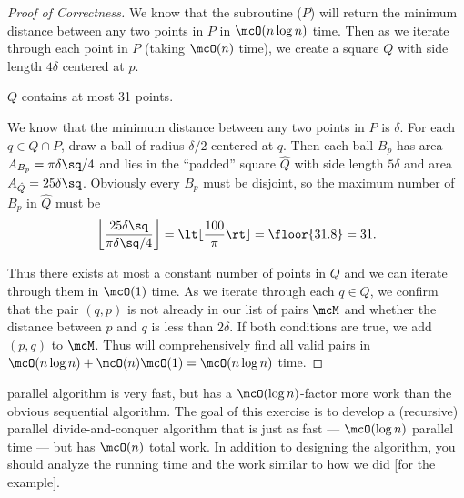 \documentclass[10pt]{article}
\begin{document}
\begin{proof}[Proof of Correctness]
We know that the subroutine ($ P $) will return the minimum distance between any two points in $ P $ in $ \mcO(n\log n) $ time. Then as we iterate through each point in $ P $ (taking $ \mcO(n) $ time), we create a square $ Q $ with side length $ 4\delta $ centered at $ p $.
  \begin{claim}
    $ Q $ contains at most 31 points.
  \end{claim}
  \begin{subproof}
  We know that the minimum distance between any two points in $ P $ is $ \delta $. For each $ q\in Q\cap P $, draw a ball of radius $ \delta/2 $ centered at $ q $. Then each ball $ B_p $ has area $ A_{B_p} = \pi \delta\sq /4 $ and lies in the ``padded'' square $ \hat Q $ with side length $ 5\delta $ and area $ A_{\hat Q} = 25\delta\sq $. Obviously every $ B_p $ must be disjoint, so the maximum number of $ B_p $ in $ \hat Q $ must be \begin{align*}
    \left\lfloor\frac{25\delta\sq}{\pi\delta\sq/4}\right\rfloor = \lt\lfloor\frac{100}{\pi}\rt\rfloor = \floor{31.8} = 31.
  \end{align*}
\end{subproof}
Thus there exists at most a constant number of points in $ Q $ and we can iterate through them in $ \mcO(1) $ time. As we iterate through each $ q\in Q $, we confirm that the pair $ (q,p) $ is not already in our list of pairs $ \mcM $ and whether the distance between $ p $ and $ q $ is less than $ 2\delta $. If both conditions are true, we add $ (p,q) $ to $ \mcM $. Thus  will comprehensively find all valid pairs in $ \mcO(n\log n) + \mcO(n)\mcO(1) = \mcO(n\log n) $ time.
\end{proof}
\pagebreak

\setcounter{exercise}{5}
\begin{exercise} %
   parallel algorithm is very fast, but has a $ \mcO(\log n) $-factor more work than the obvious sequential algorithm.
  The goal of this exercise is to develop a (recursive) parallel divide-and-conquer algorithm that is just as fast --- $ \mcO(\log n) $ parallel time --- but has $ \mcO(n) $ total work.
  In addition to designing the algorithm, you should analyze the running time and the work similar to how we did [for the example].
\end{exercise}
\end{document}
